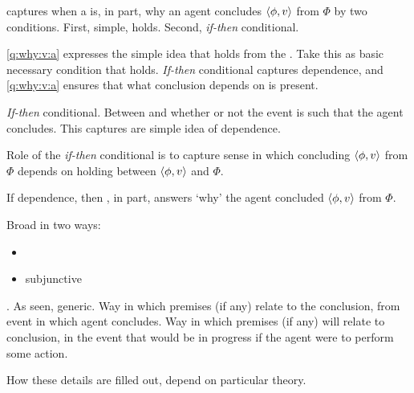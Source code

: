 \begin{note}
  \qWhyVnP{} captures when a \ros{} is, in part, why an agent concludes \(\langle \phi, v \rangle\) from \(\Phi\) by two conditions.
  First, simple, \ros{} holds.
  Second, \emph{if-then} conditional.

  \ref{q:why:v:a} expresses the simple idea that \support{} holds from the \agpe{}.
  Take this as basic necessary condition that \support{} holds.
  \emph{If-then} conditional captures dependence, and \ref{q:why:v:a} ensures that what conclusion depends on is present.

  \emph{If-then} conditional.
  Between \support{} and whether or not the event is such that the agent concludes.
  This captures are simple idea of dependence.

  Role of the \emph{if-then} conditional is to capture sense in which concluding \(\langle \phi, v \rangle\) from \(\Phi\) depends on \ros{} holding between \(\langle \phi, v \rangle\) and \(\Phi\).

  If dependence, then \ros{}, in part, answers `why' the agent concluded \(\langle \phi, v \rangle\) from \(\Phi\).
\end{note}

\begin{note}
  Broad in two ways:
  \begin{itemize}
  \item
    \ros{}
  \item
    subjunctive
  \end{itemize}
\end{note}

\begin{note}
  \ros{}.
  As seen, generic.
  Way in which premises (if any) relate to the conclusion, from event in which agent concludes.
  Way in which premises (if any) will relate to conclusion, in the event that would be in progress if the agent were to perform some action.

  How these details are filled out, depend on particular theory.
\end{note}

